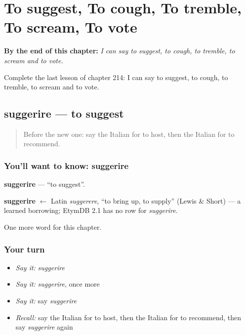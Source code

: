 
\chapter{To suggest, To cough, To tremble, To scream, To vote}
\label{ch:it-to-suggest-to-cough-to-tremble-to-scream-to-vote}

\begin{chapteropening}
\textbf{By the end of this chapter:} \emph{I can say to suggest, to cough, to tremble, to scream and to vote.}

Complete the last lesson of chapter 214: I can say to suggest, to cough, to tremble, to scream and to vote.
\end{chapteropening}

\section[suggerire]{suggerire — to suggest}

\label{lesson:IT-C214-suggerire}



\begin{quote}
Before the new one: say the Italian for to host, then the Italian for to recommend.
\end{quote}

\subsection*{You'll want to know: suggerire}
\textbf{suggerire} — \textquotedblleft{}to suggest\textquotedblright{}.

\begin{cousinweb}
\textbf{suggerire} $\leftarrow$ Latin \emph{suggerere}, \textquotedblleft{}to bring up, to supply\textquotedblright{} (Lewis \& Short) — a learned borrowing; EtymDB 2.1 has no row for \emph{suggerire}.
\end{cousinweb}

\begin{grammarlens}[title={What you've built}]
One more word for this chapter.
\end{grammarlens}

\subsection*{Your turn}
\begin{itemize}
\raggedright
  \item \emph{Say it:} \emph{suggerire}
  \item \emph{Say it:} \emph{suggerire}, once more
  \item \emph{Say it:} say \emph{suggerire}
  \item \emph{Recall:} say the Italian for to host, then the Italian for to recommend, then say \emph{suggerire} again
\end{itemize}

